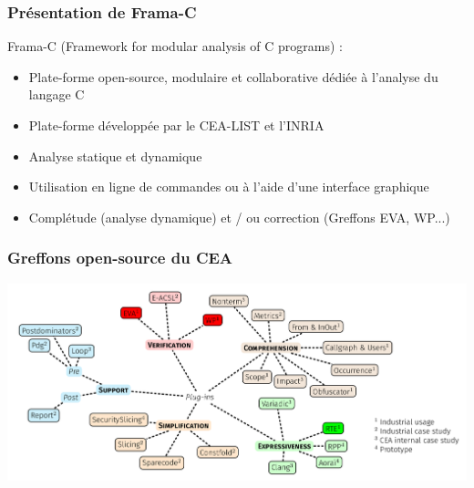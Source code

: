 \documentclass[french]{beamer}
\begin{document}
\begin{frame}
\frametitle{Présentation de Frama-C}

Frama-C (Framework for modular analysis of C programs)  :
\begin{itemize}
	\item Plate-forme open-source, modulaire et collaborative dédiée à l'analyse du langage C
	\item Plate-forme développée par le CEA-LIST et l'INRIA
	\item Analyse statique et dynamique
	\item Utilisation en ligne de commandes ou à l'aide d'une interface graphique
	\item Complétude (analyse dynamique) et / ou correction (Greffons EVA, WP...)
\end{itemize}



\end{frame}


\begin{frame}
\frametitle{Greffons open-source du CEA}



\begin{center}
    \begin{adjustbox}{width=\textwidth, totalheight=\baselineskip,keepaspectratio}
      \includegraphics{images/greffons_frama2.png}
    \end{adjustbox}
\end{center}



\end{frame}
\end{document}
